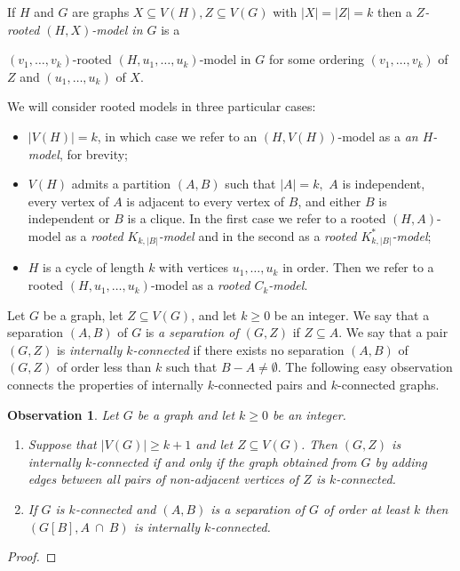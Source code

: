 \documentclass[reqno,final,12pt]{amsart}
\newtheorem{obs}[thm]{Observation}
\begin{document}
If $H$ and $G$ are graphs $X \subseteq V(H), Z \subseteq V(G)$ with $|X|=|Z|=k$ then a \emph{$Z$-rooted $(H,X)$-model in $G$} is a {$(v_1,\ldots,v_k)$-rooted $(H,u_1,\ldots,u_k)$-model  in $G$ for some ordering $(v_1,\ldots,v_k)$ of $Z$ and  $(u_1,\ldots,u_k)$ of $X$.

We will consider rooted models in three particular cases:
\begin{itemize}
	\item $|V(H)|=k$, in which case we refer to an $(H,V(H))$-model as a \emph{an $H$-model}, for brevity;
	\item $V(H)$ admits a partition $(A,B)$ such that $|A|=k,$ $A$ is independent, every vertex of  $A$ is adjacent to every vertex of $B$, and either $B$ is independent or $B$ is a clique. In the first case we refer to a rooted $(H,A)$-model as a \emph{rooted $K_{k,|B|}$-model} and in the second as a \emph{rooted $K^*_{k,|B|}$-model};
	\item $H$ is  a cycle of length $k$ with vertices $u_1,\ldots,u_k$ in order. Then we refer to a rooted $(H,u_1,\ldots,u_k)$-model as a  \emph{rooted $C_k$-model}.
\end{itemize}

Let $G$ be a graph, let $Z \subseteq V(G)$, and let $k \geq 0$ be an integer. We say that a separation $(A,B)$ of $G$ is \emph{a separation of $(G,Z)$}  if $Z \subseteq A$. We say that a pair $(G,Z)$ is \emph{internally $k$-connected} if there exists no separation $(A,B)$ of $(G,Z)$ of order less than $k$ such that $B-A \neq \emptyset$.  The following easy observation connects the properties of internally $k$-connected pairs and $k$-connected graphs.

\begin{obs}\label{o:intConnect} Let $G$ be a graph and let  $k \geq 0$ be an integer.	
	 \begin{enumerate}  
		\item Suppose that $|V(G)| \geq k+1$ and let $Z \subseteq V(G)$. Then $(G,Z)$ is internally  $k$-connected if and only if the graph obtained from $G$ by adding edges between all pairs of non-adjacent vertices of $Z$ is $k$-connected.
		\item If $G$ is $k$-connected and $(A,B)$ is a separation of $G$ of order at least $k$ then $(G[B],A~\cap~B)$ is internally $k$-connected. 
	\end{enumerate}	
\end{obs}

\begin{proof} \qquad 
	

\end{proof}}
\end{document}
